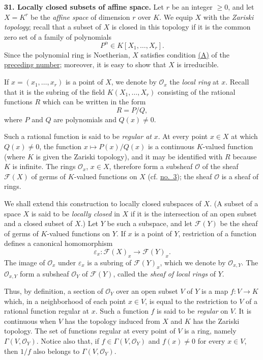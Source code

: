 
\medskip
{}\label{fac:II:1:no:31}
\textbf{31. Locally closed subsets of affine space.}
Let $r$ be an integer $\geq0$, and let $X=K^r$ be the \textit{affine space} of dimension $r$ over $K$. We equip $X$ with the \textit{Zariski topology}; recall that a subset of $X$ is closed in this topology if it is the common zero set of a family of polynomials
\[
P^{\alpha}\in K[X_1,\ldots,X_r].
\]
Since the polynomial ring is Noetherian, $X$ satisfies condition \hyperref[fac:II:1:no:30:condition:A]{(A)} of the \hyperref[fac:II:1:no:30]{preceding number}; moreover, it is easy to show that $X$ is irreducible.

If $x=(x_1,\ldots,x_r)$ is a point of $X$, we denote by $\mathcal{O}_x$ the \textit{local ring} at $x$. Recall that it is the subring of the field $K(X_1,\ldots,X_r)$ consisting of the rational functions $R$ which can be written in the form
\[
R=P/Q,
\]
where $P$ and $Q$ are polynomials and $Q(x)\neq0$.

Such a rational function is said to be \textit{regular at} $x$. At every point $x\in X$ at which $Q(x)\neq0$, the function $x\mapsto P(x)/Q(x)$ is a continuous $K$-valued function (where $K$ is given the Zariski topology), and it may be identified with $R$ because $K$ is infinite. The rings $\mathcal{O}_x$, $x\in X$, therefore form a subsheaf $\mathcal{O}$ of the sheaf $\mathcal{F}(X)$ of germs of $K$-valued functions on $X$ (cf. \hyperref[fac:I:1:no:3]{no.~3}); the sheaf $\mathcal{O}$ is a sheaf of rings.

We shall extend this construction to locally closed subspaces of $X$. (A subset of a space $X$ is said to be \textit{locally closed} in $X$ if it is the intersection of an open subset and a closed subset of $X$.) Let $Y$ be such a subspace, and let $\mathcal{F}(Y)$ be the sheaf of germs of $K$-valued functions on $Y$. If $x$ is a point of $Y$, restriction of a function defines a canonical homomorphism
\[
\varepsilon_x:\mathcal{F}(X)_x\longrightarrow\mathcal{F}(Y)_x.
\]
The image of $\mathcal{O}_x$ under $\varepsilon_x$ is a subring of $\mathcal{F}(Y)_x$, which we denote by $\mathcal{O}_{x,Y}$. The $\mathcal{O}_{x,Y}$ form a subsheaf $\mathcal{O}_Y$ of $\mathcal{F}(Y)$, called the \textit{sheaf of local rings} of $Y$.

Thus, by definition, a section of $\mathcal{O}_Y$ over an open subset $V$ of $Y$ is a map $f:V\to K$ which, in a neighborhood of each point $x\in V$, is equal to the restriction to $V$ of a rational function regular at $x$. Such a function $f$ is said to be \textit{regular} on $V$. It is continuous when $V$ has the topology induced from $X$ and $K$ has the Zariski topology. The set of functions regular at every point of $V$ is a ring, namely $\Gamma(V,\mathcal{O}_Y)$. Notice also that, if $f\in\Gamma(V,\mathcal{O}_Y)$ and $f(x)\neq0$ for every $x\in V$, then $1/f$ also belongs to $\Gamma(V,\mathcal{O}_Y)$.

